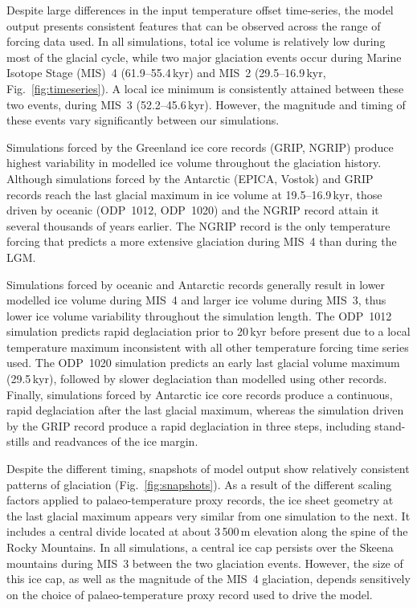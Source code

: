 \documentclass[tc, ms]{copernicus}
\begin{document}
Despite large differences in the input temperature offset time-series, the
model output presents consistent features that can be observed across the range
of forcing data used. In all simulations, total ice volume is relatively low
during most of the glacial cycle, while two major glaciation events occur
during Marine Isotope Stage (MIS)~4 (61.9--55.4\,\unit{kyr}) and MIS~2
(29.5--16.9\,\unit{kyr}, Fig.~\ref{fig:timeseries}). A local ice minimum is
consistently attained between these two events, during MIS~3
(52.2--45.6\,\unit{kyr}).
However, the magnitude and timing of these events vary significantly
between our simulations.

Simulations forced by the Greenland ice core records (GRIP, NGRIP) produce
highest variability in modelled ice volume throughout the glaciation history.
Although simulations forced by the Antarctic (EPICA, Vostok) and GRIP records
reach the last glacial maximum in ice volume at 19.5--16.9\,\unit{kyr}, those
driven by oceanic (ODP~1012, ODP~1020) and the NGRIP record attain it several
thousands of years earlier. The NGRIP record is the only temperature forcing
that predicts a more extensive glaciation during MIS~4 than during the LGM.

Simulations forced by oceanic and Antarctic records generally result in lower
modelled ice volume during MIS~4 and larger ice volume during MIS~3, thus lower
ice volume variability throughout the simulation length. The ODP~1012
simulation predicts rapid deglaciation prior to 20\,\unit{kyr}
before present due to a local temperature maximum inconsistent with all other
temperature forcing time series used. The ODP~1020 simulation predicts an early
last glacial volume maximum (29.5\,\unit{kyr}), followed by slower deglaciation
than modelled using other records. Finally, simulations forced by Antarctic ice
core records produce a continuous, rapid deglaciation after the last glacial
maximum, whereas the simulation driven by the GRIP record produce a rapid
deglaciation in three steps, including stand-stills and readvances of the ice
margin.

Despite the different timing, snapshots of model output show relatively
consistent patterns of glaciation (Fig.~\ref{fig:snapshots}). As a result of
the different scaling factors applied to palaeo-temperature proxy records, the
ice sheet geometry at the last glacial maximum appears very similar from one
simulation to the next. It includes a central divide located at about
3\,500\,\unit{m} elevation along the spine of the Rocky Mountains. In all
simulations, a central ice cap persists over the Skeena mountains during MIS~3
between the two glaciation events. However, the size of this ice cap, as well
as the magnitude of the MIS~4 glaciation, depends sensitively on the choice of
palaeo-temperature proxy record used to drive the model.
\end{document}
